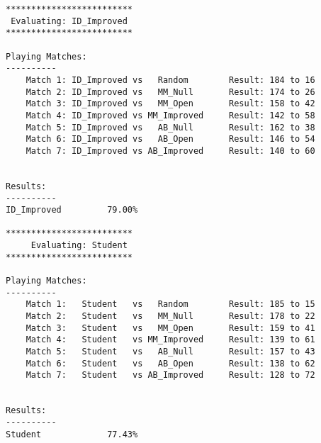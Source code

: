 \documentclass[10pt, a4paper]{article}
\begin{document}
\begin{verbatim}
*************************
 Evaluating: ID_Improved 
*************************

Playing Matches:
----------
	Match 1: ID_Improved vs   Random    	Result: 184 to 16
	Match 2: ID_Improved vs   MM_Null   	Result: 174 to 26
	Match 3: ID_Improved vs   MM_Open   	Result: 158 to 42
	Match 4: ID_Improved vs MM_Improved 	Result: 142 to 58
	Match 5: ID_Improved vs   AB_Null   	Result: 162 to 38
	Match 6: ID_Improved vs   AB_Open   	Result: 146 to 54
	Match 7: ID_Improved vs AB_Improved 	Result: 140 to 60


Results:
----------
ID_Improved         79.00%

*************************
	 Evaluating: Student   
*************************

Playing Matches:
----------
	Match 1:   Student   vs   Random    	Result: 185 to 15
	Match 2:   Student   vs   MM_Null   	Result: 178 to 22
	Match 3:   Student   vs   MM_Open   	Result: 159 to 41
	Match 4:   Student   vs MM_Improved 	Result: 139 to 61
	Match 5:   Student   vs   AB_Null   	Result: 157 to 43
	Match 6:   Student   vs   AB_Open   	Result: 138 to 62
	Match 7:   Student   vs AB_Improved 	Result: 128 to 72


Results:
----------
Student             77.43%
\end{verbatim}
\end{document}
